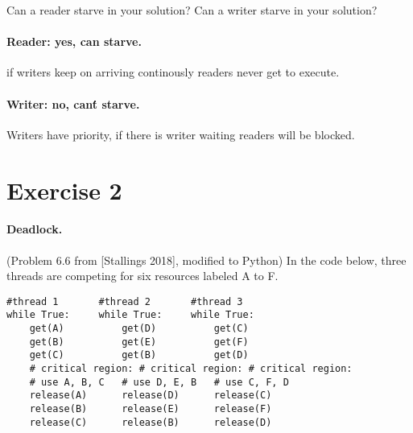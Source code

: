 \documentclass{article}
\newcommand{\exercise}[1]{
    \section*{Exercise #1}
    \markboth{Exercise #1}{}
}
\begin{document}
\begin{enumerate}[label=\textbf{\makebox[1cm][l]{\Huge\text{(\stylishfont\alph*)}}}, leftmargin=!, labelindent=0pt]
    \item Can a reader starve in your solution? Can a writer starve
    in your solution?
    \paragraph{Reader: yes, can starve.} if writers keep on arriving
    continously readers never get to execute.
    \paragraph{Writer: no, can\'t starve.} Writers have priority, if
    there is writer waiting readers will be blocked.

\end{enumerate}







\newpage
\exercise{2}
\paragraph{Deadlock.} (Problem 6.6 from [Stallings 2018], modified to Python) In the code
below, three threads are competing for six resources labeled A to F.
\begin{verbatim}
#thread 1       #thread 2       #thread 3
while True:     while True:     while True:
    get(A)          get(D)          get(C)
    get(B)          get(E)          get(F)
    get(C)          get(B)          get(D)
    # critical region: # critical region: # critical region:
    # use A, B, C   # use D, E, B   # use C, F, D
    release(A)      release(D)      release(C)
    release(B)      release(E)      release(F)
    release(C)      release(B)      release(D)
\end{verbatim}
\end{document}
